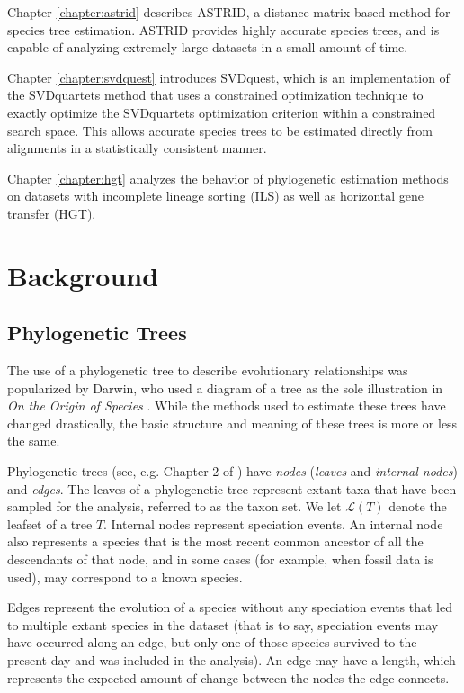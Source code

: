 \documentclass[tocnosub,noragright,centerchapter,fullpagesingle,12pt]{uiuc_csthesis18}
\begin{document}
Chapter \ref{chapter:astrid} describes ASTRID, a distance matrix based
method for species tree estimation. ASTRID provides highly accurate
species trees, and is capable of analyzing extremely large datasets in
a small amount of time.

Chapter \ref{chapter:svdquest} introduces SVDquest, which is an
implementation of the SVDquartets method that uses a constrained
optimization technique to exactly optimize the SVDquartets
optimization criterion within a constrained search space. This allows
accurate species trees to be estimated directly from alignments in a
statistically consistent manner.

Chapter \ref{chapter:hgt} analyzes the behavior of phylogenetic
estimation methods on datasets with incomplete lineage sorting (ILS)
as well as horizontal gene transfer (HGT). 


\chapter{Background}
\label{chapter:background}
\section{Phylogenetic Trees}

The use of a phylogenetic tree to describe evolutionary relationships
was popularized by Darwin, who used a diagram of a tree as the sole
illustration in \emph{On the Origin of Species}
\cite{darwin1859origin}. While the methods used to estimate these
trees have changed drastically, the basic structure and meaning of
these trees is more or less the same.

Phylogenetic trees (see, e.g. Chapter 2 of \cite{warnow2017computational}) have \emph{nodes} (\emph{leaves} and \emph{internal
  nodes}) and \emph{edges}.
The leaves of a phylogenetic tree represent extant taxa that have been
sampled for the analysis, referred to as the taxon set.
We let $\mathcal{L}(T)$ denote the leafset of a tree $T$. 
Internal nodes represent speciation events. An internal node also
represents a species that is the most recent common ancestor of all
the descendants of that node, and in some cases (for example, when
fossil data is used), may correspond to a known species.

Edges represent the evolution of a species without any speciation
events that led to multiple extant species in the dataset (that is to
say, speciation events may have occurred along an edge, but only one
of those species survived to the present day and was included in the
analysis). An edge may have a length, which represents the expected amount of change between the nodes the edge connects.
\end{document}
